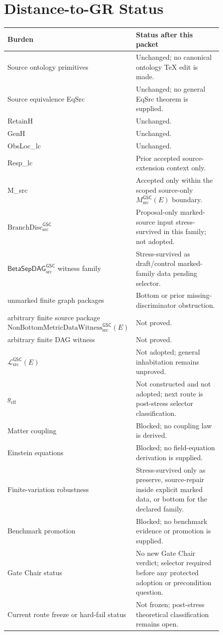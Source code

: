 \documentclass[11pt]{article}
\newcommand{\Witness}{\mathrm{NonBottomMetricDataWitness}_{\mathrm{src}}^{\mathsf{GSC}}}
\newcommand{\MetricData}{\mathcal{L}_{\mathrm{src}}^{\mathsf{GSC}}}
\newcommand{\geff}{g_{\mathrm{eff}}}
\newcommand{\BranchDisc}{\mathrm{BranchDisc}_{\mathrm{src}}^{\mathsf{GSC}}}
\newcommand{\BetaGraph}{\mathsf{BetaSepDAG}_{\mathrm{src}}^{\mathsf{GSC}}}
\begin{document}
\section{Distance-to-GR Status}

\begin{longtable}{p{0.30\linewidth}p{0.56\linewidth}}
\toprule
Burden & Status after this packet \\
\midrule
Source ontology primitives & Unchanged; no canonical ontology TeX edit is made. \\
Source equivalence EqSrc & Unchanged; no general EqSrc theorem is supplied. \\
RetainH & Unchanged. \\
GenH & Unchanged. \\
ObsLoc\_lc & Unchanged. \\
Resp\_lc & Prior accepted source-extension context only. \\
M\_src & Accepted only within the scoped source-only \(M_{\mathrm{src}}^{\mathsf{GSC}}(E)\) boundary. \\
\(\BranchDisc\) & Proposal-only marked-source input stress-survived in this family; not adopted. \\
\(\BetaGraph\) witness family & Stress-survived as draft/control marked-family data pending selector. \\
unmarked finite graph packages & Bottom or prior missing-discriminator obstruction. \\
arbitrary finite source package \(\Witness(E)\) & Not proved. \\
arbitrary finite DAG witness & Not proved. \\
\(\MetricData(E)\) & Not adopted; general inhabitation remains unproved. \\
\(\geff\) & Not constructed and not adopted; next route is post-stress selector classification. \\
Matter coupling & Blocked; no coupling law is derived. \\
Einstein equations & Blocked; no field-equation derivation is supplied. \\
Finite-variation robustness & Stress-survived only as preserve, source-repair inside explicit marked data, or bottom for the declared family. \\
Benchmark promotion & Blocked; no benchmark evidence or promotion is supplied. \\
Gate Chair status & No new Gate Chair verdict; selector required before any protected adoption or precondition question. \\
Current route freeze or hard-fail status & Not frozen; post-stress theoretical classification remains open. \\
\bottomrule
\end{longtable}
\end{document}
